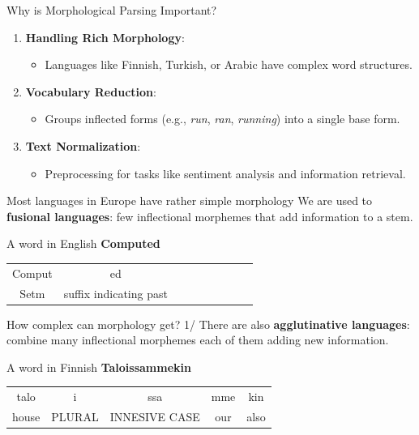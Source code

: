 \documentclass{beamer}
\begin{document}
\begin{frame}{Why is Morphological Parsing Important?}
    \begin{enumerate}
        \item \textbf{Handling Rich Morphology}:
        \begin{itemize}
            \item Languages like Finnish, Turkish, or Arabic have complex word structures.
        \end{itemize}
        \item \textbf{Vocabulary Reduction}:
        \begin{itemize}
            \item Groups inflected forms (e.g., \textit{run}, \textit{ran}, \textit{running}) into a single base form.
        \end{itemize}
        \item \textbf{Text Normalization}:
        \begin{itemize}
            \item Preprocessing for tasks like sentiment analysis and information retrieval.
        \end{itemize}
    \end{enumerate}
\end{frame}

\begin{frame}{Most languages in Europe have rather simple morphology}
 We are used to \textbf{fusional languages}: few inflectional morphemes that add information to a stem.
  \begin{exampleblock}{A word in English}
     \textbf{Computed}
  \end{exampleblock}

\vspace{1cm}

  \begin{tabular}{ccccccccc}
  Comput & ed \\
  Setm & suffix indicating past \\
  \end{tabular}

 
\end{frame}


\begin{frame}{How complex can morphology get? 1/}
 There are also \textbf{agglutinative languages}: combine many inflectional morphemes each of them adding new information.
  \begin{exampleblock}{A word in Finnish}
     \textbf{Taloissammekin}
  \end{exampleblock}

\vspace{1cm}

  \begin{tabular}{ccccc}
  talo & i & ssa & mme & kin \\
  house & PLURAL & INNESIVE CASE & our & also \\
  
  \end{tabular}

 
\end{frame}
\end{document}
